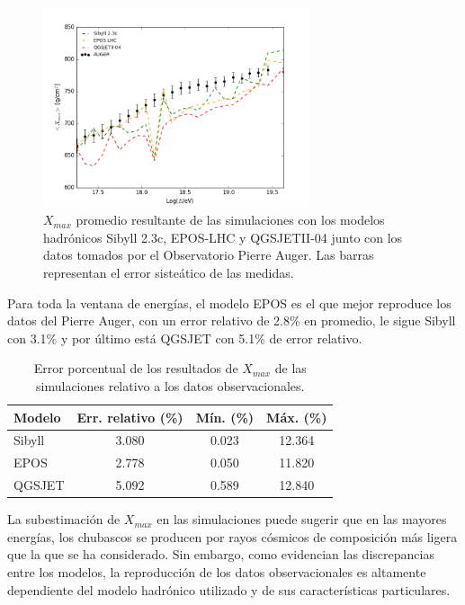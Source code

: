 \begin{figure}[h]
\centering
\includegraphics[width=0.7\textwidth]{Figuras/Xmax_modelos_obs} 
\caption{$X_{max}$ promedio resultante de las simulaciones con los modelos hadrónicos Sibyll 2.3c, EPOS-LHC y QGSJETII-04 junto con los datos tomados por el Observatorio Pierre Auger. Las barras representan el error sisteático de las medidas.}
\label{fig:Xobs}
\end{figure}	

Para toda la ventana de energías, el modelo EPOS es el que mejor reproduce los datos del Pierre Auger, con un error relativo de 2.8\% en promedio, le sigue Sibyll con 3.1\% y por último está QGSJET con 5.1\% de error relativo.\\

\begin{table}[h]
\centering
\caption{Error porcentual de los resultados de $X_{max}$ de las simulaciones relativo a los datos observacionales.}
\begin{tabular}{l|ccc}
\hline
Modelo & Err. relativo (\%) & Mín. (\%) & Máx. (\%) \\ \hline
Sibyll & 3.080              & 0.023     & 12.364    \\ \hline
EPOS   & 2.778              & 0.050     & 11.820    \\ \hline
QGSJET & 5.092              & 0.589     & 12.840    \\ \hline
\end{tabular}
\end{table}

La subestimación de $X_{max}$ en las simulaciones puede sugerir que en las mayores energías, los chubascos se producen por rayos cósmicos de composición más ligera que la que se ha considerado. Sin embargo, como evidencian las discrepancias entre los modelos, la reproducción de los datos observacionales es altamente dependiente del modelo hadrónico utilizado y de sus características particulares.


